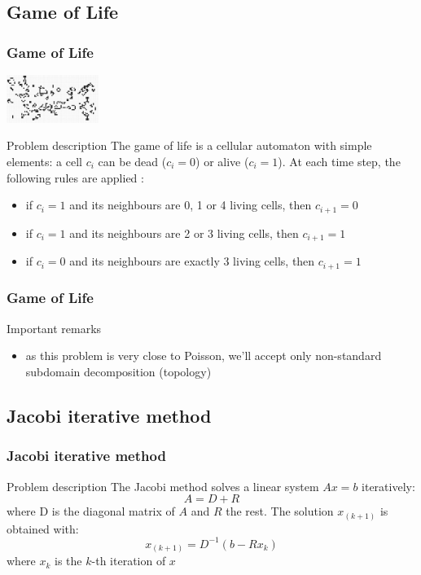 \subsection{Game of Life}
\begin{frame}[containsverbatim]
\frametitle{Game of Life}
\begin{center}
\includegraphics[width=3.0cm]{Day2/images/gameoflife.png}
\end{center}
\begin{block}{Problem description}
The game of life is a cellular automaton with simple elements: a cell $c_i$ can be dead ($c_i = 0$) or alive ($c_i = 1$). At each time step, the following rules are applied :
\begin{itemize}
	\item {if $c_i = 1$ and its neighbours are 0, 1 or 4 living cells, then $c_{i+1} = 0$}
	\item {if $c_i = 1$ and its neighbours are 2 or 3 living cells, then $c_{i+1} = 1$}
	\item {if $c_i = 0$ and its neighbours are exactly 3 living cells, then $c_{i+1} = 1$}
\end{itemize}
\end{block}
\end{frame}
\begin{frame}[containsverbatim]
\frametitle{Game of Life}
\begin{block}{Important remarks}
\begin{itemize}
	\item{as this problem is very close to Poisson, we'll accept only non-standard subdomain decomposition (topology)}
\end{itemize}
\end{block}
\end{frame}




\subsection{Jacobi iterative method}
\begin{frame}[containsverbatim]
\frametitle{Jacobi iterative method}
\begin{block}{Problem description}
The Jacobi method solves a linear system $Ax = b$ iteratively:
$$
A = D + R
$$
where D is the diagonal matrix of $A$ and $R$ the rest. The solution $x_{(k+1)}$ is obtained with:
$$
x_{(k+1)} = D^{-1} ( b - R x_k)
$$
where $x_k$ is the $k$-th iteration of $x$
\end{block}
\end{frame}



